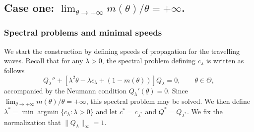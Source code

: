 \documentclass[11pt]{article}    %
\DeclareMathOperator{\argmin}{argmin}
\begin{document}
\subsection{Case one: $\lim_{\theta \to + \infty} m(\theta)/\theta = +\infty$.}\label{sec:caseone}

\subsubsection{Spectral problems and minimal speeds}

We start the construction by defining speeds of propagation for the travelling waves. Recall that for any $\lambda >0$, the spectral problem defining $c_\lambda$ is written as follows
\begin{equation*}
		Q_\lambda'' + \left[  \lambda^2 \theta - \lambda c_\lambda + (1 -  m(\theta)) \right] Q_\lambda  = 0, \qquad \theta \in \Theta,
\end{equation*}
accompanied by the Neumann condition $Q_\lambda'(\underline \theta) = 0$.  Since $\lim_{\theta \to + \infty} m(\theta)/\theta = +\infty$, this spectral problem may be solved. We then define $\lambda^* = \min\argmin\{c_\lambda: \lambda > 0\}$ and let $c^* = c_{\lambda^*}$ and $Q^* = Q_{\lambda^*}$.  We fix the normalization that $\|Q_\lambda\|_\infty = 1$.
\end{document}
